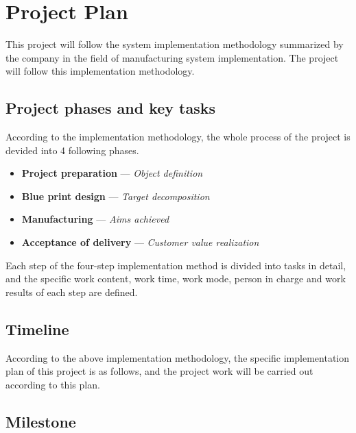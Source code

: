 \chapter{Project Plan}

This project will follow the system implementation methodology summarized by the company in the field of manufacturing system implementation. The project will follow this implementation methodology.

\section{Project phases and key tasks}

{\color{red}{WBS分解}}

According to the implementation methodology, the whole process of the project is devided into 4 following phases.

\begin{itemize}
	\item \textbf{Project preparation} --- \textit{Object definition}

	\item \textbf{Blue print design} --- \textit{Target decomposition}

	\item \textbf{Manufacturing} --- \textit{Aims achieved}

	\item \textbf{Acceptance of delivery} --- \textit{Customer value realization}
\end{itemize}

Each step of the four-step implementation method is divided into tasks in detail, and the specific work content, work time, work mode, person in charge and work results of each step are defined.

\section{Timeline}

According to the above implementation methodology, the specific implementation plan of this project is as follows, and the project work will be carried out according to this plan.

{\color{red}{甘特图}}

\section{Milestone}

